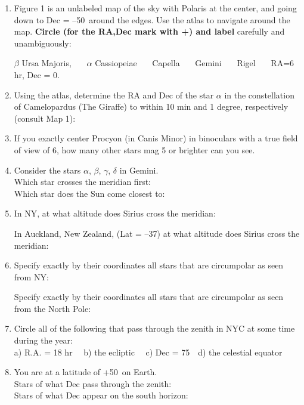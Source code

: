\documentclass[11pt]{article}
\begin{document}
\bigskip
\begin{enumerate}

\item 
Figure 1 is an unlabeled map of the sky with Polaris at the center, and
going down to Dec = --50\deg\ around the edges.  Use the atlas to
navigate around the map. {\bf Circle (for the RA,Dec mark with +) and label}
carefully and unambiguously: 

\medskip
$\beta$ Ursa Majoris, \ \ \  $\alpha$ Cassiopeiae \ \ \ Capella \ \ \
Gemini \ \ \ Rigel  \ \ \  RA=6 hr, Dec = 0\deg.

\vskip 1.0cm
\item 
Using the atlas, determine the RA and Dec of the star $\alpha$ in the
constellation of Camelopardus (The Giraffe) to within 10
min and 1 degree, respectively (consult Map 1):

\vskip 1.0cm

\item 
If you exactly center Procyon (in Canis Minor) in binoculars with a true
field of view of  6\deg, how many other stars mag 5 or brighter can you see. 

\vskip 1.0cm
\item
Consider the stars $\alpha$, $\beta$, $\gamma$, $\delta$ in Gemini.\\
Which star crosses the meridian first:\\
Which star does the Sun come closest to:

\vskip 1.0cm
\item 
In NY, at what altitude does Sirius cross the meridian: 

\medskip
In Auckland, New Zealand, (Lat = --37\deg) at what altitude does Sirius
cross the meridian:

\vskip 1.0cm
\item
Specify exactly by their coordinates all stars that are circumpolar as
seen from NY: 

\medskip
Specify exactly by their coordinates all stars that are circumpolar as
seen from the North Pole:


\vskip 1.0cm
\item
Circle all of the following that pass through the zenith in NYC at
some time during the year:\\
a) R.A. = 18 hr \ \   b) the ecliptic \ \  
c) Dec = 75\deg \ \ d) the celestial equator

\vskip 1.0cm
\item 
You are at a latitude of +50\deg\ on Earth. \\
Stars of what Dec pass through the zenith:\\
Stars of what Dec appear on the south horizon:


\end{enumerate}
\end{document}
